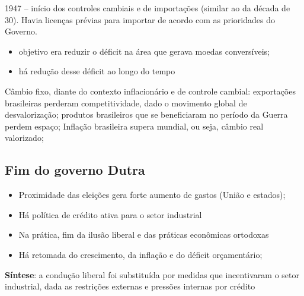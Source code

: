 \documentclass[a4paper,12pt]{article}[abntex2]
\begin{document}
 1947 – início dos controles cambiais e de importações (similar ao da década de 30). Havia licenças prévias para importar de acordo com as prioridades do Governo.
     \begin{itemize}
         \item objetivo era reduzir o déficit na área que gerava moedas conversíveis;
         \item há redução desse déficit ao longo do tempo
     \end{itemize}
 Câmbio fixo, diante do contexto inflacionário e de controle cambial:
     exportações brasileiras perderam competitividade, dado o movimento global de desvalorização;
     produtos brasileiros que se beneficiaram no período da Guerra perdem espaço;
     Inflação brasileira supera mundial, ou seja, câmbio real valorizado;

\subsection{Fim do governo Dutra}
\begin{itemize}
    \item Proximidade das eleições gera forte aumento de gastos (União e estados);
\end{itemize}
\begin{itemize}
    \item Há política de crédito ativa para o setor industrial
\end{itemize}
 \begin{itemize}
     \item Na prática, fim da ilusão liberal e das práticas econômicas ortodoxas
 \end{itemize}
     \begin{itemize}
         \item Há retomada do crescimento, da inflação e do déficit orçamentário;


     \end{itemize}


\textbf{ Síntese}: a condução liberal foi substituída por medidas que incentivaram o setor industrial, dada as restrições externas e pressões internas por crédito
\end{document}
